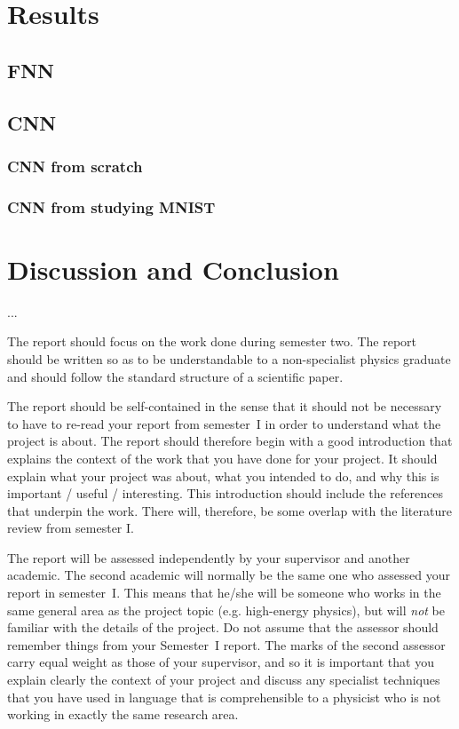 \documentclass[a4paper,fleqn,usenatbib]{mnras}
\begin{document}
\section{Results}

\subsection{FNN}

\subsection{CNN}

\subsubsection{CNN from scratch}

\subsubsection{CNN from studying MNIST}

\section{Discussion and Conclusion}
...




The report should focus on the work done during semester two. The report should be written so as to be understandable to a non-specialist physics graduate and should follow the standard structure of a scientific paper. 

The report should be self-contained in the sense that it should not be necessary to have to re-read your report from semester~I in order to understand what the project is about. The report should therefore begin with a good introduction that explains the context of the work that you have done for your project. It should explain what your project was about, what you intended to do, and why this is important / useful / interesting. This introduction should include the references that underpin the work. There will, therefore, be some overlap with the literature review from semester I.

The report will be assessed independently by your supervisor and another academic. The second academic will normally be the same one who assessed your report in semester~I. This means that he/she will be someone who works in the same general area as the project topic (e.g. high-energy physics), but will {\em not} be familiar with the details of the project. Do not assume that the assessor should remember things from your Semester~I report. The marks of the second assessor carry equal weight as those of your supervisor, and so it is important that you explain clearly the context of your project and discuss any specialist techniques that you have used in language that is comprehensible to a physicist who is not working in exactly the same research area.
\end{document}
